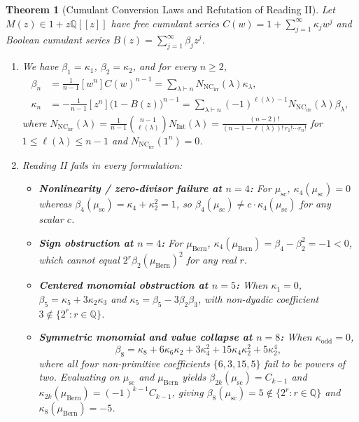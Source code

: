\documentclass[11pt,a4paper]{article}
\newtheorem{theorem}{Theorem}[section]
\theoremstyle{definition}
\theoremstyle{remark}
\newcommand{\NCirr}{\mathrm{NC}_{\mathrm{irr}}}
\newcommand{\IntP}{\mathrm{Int}}
\newcommand{\Bern}{\mu_{\mathrm{Bern}}}
\newcommand{\Wig}{\mu_{\mathrm{sc}}}
\begin{document}
\begin{theorem}[Cumulant Conversion Laws and Refutation of Reading II]\label{thm:reading2}
Let $M(z) \in 1 + z \mathbb{Q}[[z]]$ have free cumulant series $C(w) = 1 + \sum_{j=1}^\infty \kappa_j w^j$ and Boolean cumulant series $B(z) = \sum_{j=1}^\infty \beta_j z^j$.
\begin{enumerate}
  \item[(a)] We have $\beta_1 = \kappa_1$, $\beta_2 = \kappa_2$, and for every $n \ge 2$,
  \begin{align}
    \beta_n &= \frac{1}{n-1} [w^n] C(w)^{n-1} = \sum_{\lambda \vdash n} N_{\NCirr}(\lambda) \kappa_\lambda, \label{eq:lagrange-beta}\\
    \kappa_n &= -\frac{1}{n-1} [z^n] \bigl(1 - B(z)\bigr)^{n-1} = \sum_{\lambda \vdash n} (-1)^{\ell(\lambda)-1} N_{\NCirr}(\lambda) \beta_\lambda, \label{eq:lagrange-kappa}
  \end{align}
  where $N_{\NCirr}(\lambda) = \frac{1}{n-1}\binom{n-1}{\ell(\lambda)} N_{\IntP}(\lambda) = \frac{(n-2)!}{(n - 1 - \ell(\lambda))! \, r_1! \cdots r_n!}$ for $1 \le \ell(\lambda) \le n-1$ and $N_{\NCirr}(1^n) = 0$.
  \item[(b)] Reading II fails in every formulation:
  \begin{itemize}
    \item \textbf{Nonlinearity / zero-divisor failure at $n = 4$:} For $\Wig$, $\kappa_4(\Wig) = 0$ whereas $\beta_4(\Wig) = \kappa_4 + \kappa_2^2 = 1$, so $\beta_4(\Wig) \ne c \cdot \kappa_4(\Wig)$ for any scalar $c$.
    \item \textbf{Sign obstruction at $n = 4$:} For $\Bern$, $\kappa_4(\Bern) = \beta_4 - \beta_2^2 = -1 < 0$, which cannot equal $2^r \beta_2(\Bern)^2$ for any real $r$.
    \item \textbf{Centered monomial obstruction at $n = 5$:} When $\kappa_1 = 0$, $\beta_5 = \kappa_5 + 3 \kappa_2 \kappa_3$ and $\kappa_5 = \beta_5 - 3 \beta_2 \beta_3$, with non-dyadic coefficient $3 \notin \{2^r : r \in \mathbb{Q}\}$.
    \item \textbf{Symmetric monomial and value collapse at $n = 8$:} When $\kappa_{\text{odd}} = 0$,
    \[
      \beta_8 = \kappa_8 + 6 \kappa_6 \kappa_2 + 3 \kappa_4^2 + 15 \kappa_4 \kappa_2^2 + 5 \kappa_2^4,
    \]
    where all four non-primitive coefficients $\{6, 3, 15, 5\}$ fail to be powers of two. Evaluating on $\Wig$ and $\Bern$ yields $\beta_{2k}(\Wig) = C_{k-1}$ and $\kappa_{2k}(\Bern) = (-1)^{k-1} C_{k-1}$, giving $\beta_8(\Wig) = 5 \notin \{2^r : r \in \mathbb{Q}\}$ and $\kappa_8(\Bern) = -5$.
  \end{itemize}
\end{enumerate}
\end{theorem}
\end{document}
